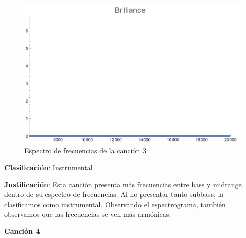 \documentclass[12pt, letterpaper]{article}
\begin{document}
\begin{figure}[H]
\begin{minipage}{.3\textwidth}
  \end{minipage}
  \begin{minipage}{0.03\textwidth}\end{minipage}
  \begin{minipage}{.3\textwidth}
    \centering
    \includegraphics[width=.9\linewidth]{imgs/Cancion3/brilliance.png}
  \end{minipage}
  \caption{Espectro de frecuencias de la canción 3}
  \label{fig:esp03}
\end{figure}

\textbf{Clasificación}: Instrumental

\textbf{Justificación}: Esta canción presenta más frecuencias entre bass
y midrange dentro de su espectro de frecuencias. Al no presentar tanto subbass,
la clasificamos como instrumental. Observando el espectrograma, también observamos
que las frecuencias se ven más armónicas.

\newpage

\textbf{\large{Canción 4}}
\end{document}
